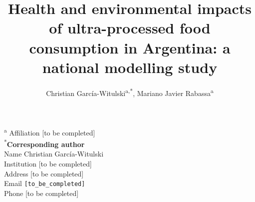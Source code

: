 ﻿\documentclass{article}
\title{Health and environmental impacts of ultra-processed food consumption in Argentina: a national modelling study \bigskip}
\author{Christian Garc\'ia-Witulski\textsuperscript{a,*}, Mariano Javier Rabassa\textsuperscript{a}}
\date{}
\begin{document}
\maketitle
\thispagestyle{empty}

\noindent\textsuperscript{a} Affiliation [to be completed]\\

\vspace{1.2cm}
\noindent\textsuperscript{*}\textbf{Corresponding author}\\
Name Christian Garc\'ia-Witulski\\
Institution [to be completed]\\
Address [to be completed]\\
Email \texttt{[to\_be\_completed]}\\
Phone [to be completed]

\onehalfspacing
\vspace{1.0cm}
\end{document}
